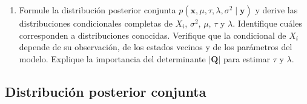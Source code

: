 \documentclass[11pt,a4paper]{article}
\begin{document}
\begin{enumerate}[label=\arabic*.]
    \item Formule la distribución posterior conjunta $p(\boldsymbol{x}, \mu, \tau, \lambda, \sigma^2 \mid \boldsymbol{y})$ y derive las distribuciones condicionales completas de $X_i$, $\sigma^2$, $\mu$, $\tau$ y $\lambda$. Identifique cuáles corresponden a distribuciones conocidas. Verifique que la condicional de $X_i$ depende de su observación, de los estados vecinos y de los parámetros del modelo. Explique la importancia del determinante $|\mathbf{Q}|$ para estimar $\tau$ y $\lambda$.
\end{enumerate}

\subsection{Distribución posterior conjunta}
\end{document}
